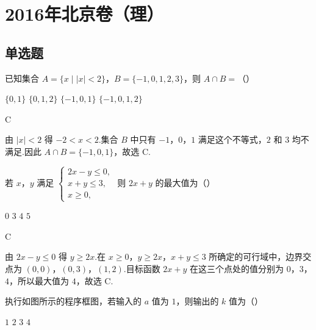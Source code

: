 
\chapter{2016年北京卷（理）}

\section{单选题}

\begin{problem}
已知集合 \(A=\{x\mid |x|<2\}\)，\(B=\{-1,0,1,2,3\}\)，则 \(A\cap B=\)（\quad）

\choices
    {\(\{0,1\}\)}
    {\(\{0,1,2\}\)}
    {\(\{-1,0,1\}\)}
    {\(\{-1,0,1,2\}\)}
\end{problem}

\begin{answer}
C
\end{answer}

\begin{solution}
由 \(|x|<2\) 得 \(-2<x<2\).集合 \(B\) 中只有 \(-1\)，\(0\)，\(1\) 满足这个不等式，\(2\) 和 \(3\) 均不满足.因此
\(A\cap B=\{-1,0,1\}\)，故选 C.
\end{solution}

\begin{problem}
若 \(x\)，\(y\) 满足 \(\begin{cases}
2x-y\le 0,\\
x+y\le 3,\\
x\ge 0,
\end{cases}\)
则 \(2x+y\) 的最大值为（\quad）

\choices
    {\(0\)}
    {\(3\)}
    {\(4\)}
    {\(5\)}
\end{problem}

\begin{answer}
C
\end{answer}

\begin{solution}
由 \(2x-y\le 0\) 得 \(y\ge 2x\).在 \(x\ge0\)，\(y\ge2x\)，\(x+y\le3\) 所确定的可行域中，边界交点为 \((0,0)\)，\((0,3)\)，\((1,2)\).目标函数 \(2x+y\) 在这三个点处的值分别为 \(0\)，\(3\)，\(4\)，所以最大值为 \(4\)，故选 C.
\end{solution}

\begin{problem}
执行如图所示的程序框图，若输入的 \(a\) 值为 \(1\)，则输出的 \(k\) 值为（\quad）

\begingroup
{}
\endgroup

\choices
    {\(1\)}
    {\(2\)}
    {\(3\)}
    {\(4\)}
\end{problem}

